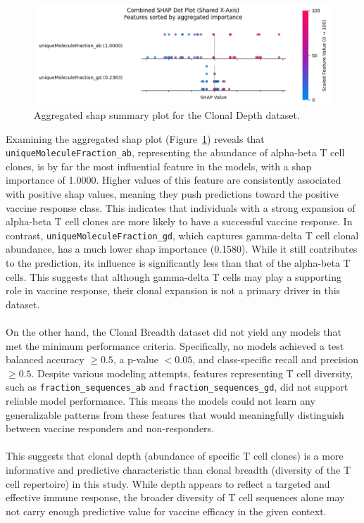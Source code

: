 \documentclass[12pt,a4paper]{report}
\begin{document}
\begin{figure}[h!]
    \centering
    \includegraphics[width=0.85\linewidth]{images/Aggregated_SHAP_Clonal_Depth_selected.png}
    \caption[Aggregated SHAP plot for Clonal Depth]{Aggregated \gls{shap} summary plot for the Clonal Depth dataset.}
    \label{fig:clonal_depth_shap_plot}
\end{figure}
\noindent
Examining the aggregated \gls{shap} plot (Figure~\ref{fig:clonal_depth_shap_plot}) reveals that \texttt{uniqueMoleculeFraction\_ab}, representing the abundance of alpha-beta T cell clones, is by far the most influential feature in the models, with a \gls{shap} importance of 1.0000. Higher values of this feature are consistently associated with positive \gls{shap} values, meaning they push predictions toward the positive vaccine response class. This indicates that individuals with a strong expansion of alpha-beta T cell clones are more likely to have a successful vaccine response. In contrast, \texttt{uniqueMoleculeFraction\_gd}, which captures gamma-delta T cell clonal abundance, has a much lower \gls{shap} importance (0.1580). While it still contributes to the prediction, its influence is significantly less than that of the alpha-beta T cells. This suggests that although gamma-delta T cells may play a supporting role in vaccine response, their clonal expansion is not a primary driver in this dataset.\\
\\
On the other hand, the Clonal Breadth dataset did not yield any models that met the minimum performance criteria. Specifically, no models achieved a test balanced accuracy $\geq 0.5$, a p-value $< 0.05$, and class-specific recall and precision $\geq 0.5$. Despite various modeling attempts, features representing T cell diversity, such as \texttt{fraction\_sequences\_ab} and \texttt{fraction\_sequences\_gd}, did not support reliable model performance. This means the models could not learn any generalizable patterns from these features that would meaningfully distinguish between vaccine responders and non-responders.\\
\\
This suggests that clonal depth (abundance of specific T cell clones) is a more informative and predictive characteristic than clonal breadth (diversity of the T cell repertoire) in this study. While depth appears to reflect a targeted and effective immune response, the broader diversity of T cell sequences alone may not carry enough predictive value for vaccine efficacy in the given context.
\end{document}
